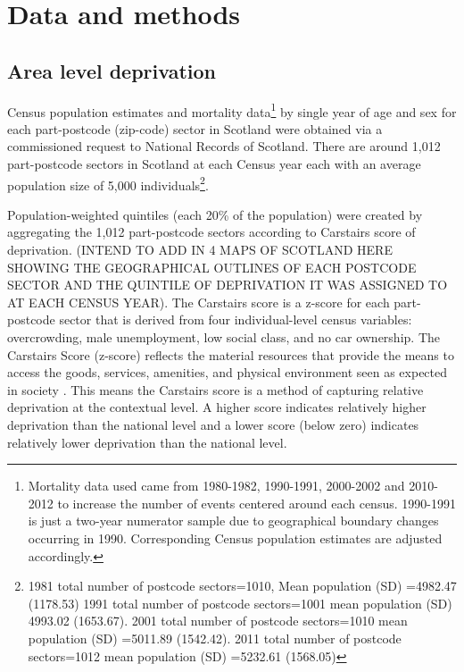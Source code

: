 \documentclass[12pt,oneside,a4paper]{article} %
\theoremstyle{definition}
\begin{document}
\section{Data and methods}

\subsection{Area level deprivation}
Census population estimates and mortality data\footnote{Mortality data used
came from 1980-1982, 1990-1991, 2000-2002 and 2010-2012 to increase the
number of events centered around each census. 1990-1991 is just a two-year
numerator sample due to geographical boundary changes occurring in 1990.
Corresponding Census population estimates are adjusted accordingly.} by single
year of age and sex for each part-postcode (zip-code) sector in Scotland were obtained via a commissioned request to National Records of Scotland. There are around 1,012 part-postcode sectors in Scotland at each Census year each with an average population size of 5,000 individuals\footnote{1981 total number of postcode sectors=1010, Mean population (SD) =4982.47 (1178.53) 
  1991 total number of postcode sectors=1001 mean population (SD) 4993.02 (1653.67). 2001 total number of postcode sectors=1010 mean population (SD) =5011.89 (1542.42). 2011 total number of postcode sectors=1012 mean population (SD) =5232.61 (1568.05)}.
 
Population-weighted quintiles (each 20\% of the population) were created by
aggregating the 1,012 part-postcode sectors according to Carstairs score of
deprivation. (INTEND TO ADD IN 4 MAPS OF SCOTLAND HERE SHOWING THE GEOGRAPHICAL OUTLINES OF EACH POSTCODE SECTOR AND THE QUINTILE OF DEPRIVATION IT WAS ASSIGNED TO AT EACH CENSUS YEAR). The Carstairs score is a z-score for each part-postcode sector
that is derived from four individual-level census variables: overcrowding, male
unemployment, low social class, and no car ownership. The Carstairs Score
(z-score) reflects the material resources that provide the means to access the
goods, services, amenities, and physical environment seen as expected
in society \citep{Carstairs1989}. This means the Carstairs score is a method of capturing relative deprivation at the contextual level. A higher score indicates relatively higher deprivation than the national level and a lower score (below zero) indicates relatively lower deprivation than the national level.
\end{document}
